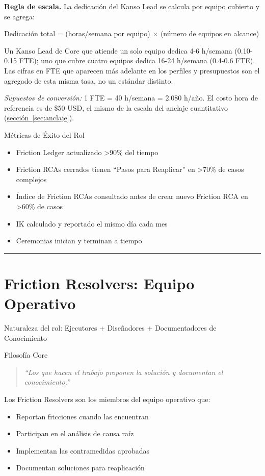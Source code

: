 \textbf{Regla de escala.} La dedicación del Kanso Lead se calcula por equipo cubierto y se agrega:

\begin{center}
Dedicación total = (horas/semana por equipo) $\times$ (número de equipos en alcance)
\end{center}

Un Kanso Lead de Core que atiende un solo equipo dedica 4-6 h/semana (0.10-0.15 FTE); uno que
cubre cuatro equipos dedica 16-24 h/semana (0.4-0.6 FTE). Las cifras en FTE que aparecen más
adelante en los perfiles y presupuestos son el agregado de esta misma tasa, no un estándar
distinto.

\textit{Supuestos de conversión:} 1 FTE = 40 h/semana = 2.080 h/año. El costo hora de referencia
es de \$50 USD, el mismo de la escala del anclaje cuantitativo
(\hyperref[sec:anclaje]{sección~\ref{sec:anclaje}}).

Métricas de Éxito del Rol
\begin{itemize}
    \item Friction Ledger actualizado >90\% del tiempo
    \item Friction RCAs cerrados tienen ``Pasos para Reaplicar'' en >70\% de casos complejos
    \item Índice de Friction RCAs consultado antes de crear nuevo Friction RCA en >60\% de casos
    \item IK calculado y reportado el mismo día cada mes
    \item Ceremonias inician y terminan a tiempo
\end{itemize}

\hrule
\section{Friction Resolvers: Equipo Operativo}

Naturaleza del rol: Ejecutores + Diseñadores + Documentadores de Conocimiento

Filosofía Core

\begin{quote}
\textit{``Los que hacen el trabajo proponen la solución y documentan el conocimiento.''}
\end{quote}

Los Friction Resolvers son los miembros del equipo operativo que:

\begin{itemize}
    \item Reportan fricciones cuando las encuentran
    \item Participan en el análisis de causa raíz
    \item Implementan las contramedidas aprobadas
    \item Documentan soluciones para reaplicación
\end{itemize}

